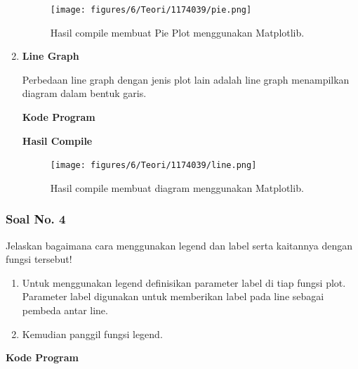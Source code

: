 \begin{enumerate}
	\begin{figure}[H]
		\texttt{[image: figures/6/Teori/1174039/pie.png]}
		\centering
		\caption{Hasil compile membuat Pie Plot menggunakan Matplotlib.}
	\end{figure}
	
	\item \textbf{Line Graph}
	
	Perbedaan line graph dengan jenis plot lain adalah line graph menampilkan diagram dalam bentuk garis.
	
	\textbf{Kode Program}
	
	
	
	\textbf{Hasil Compile}
	
	\begin{figure}[H]
		\texttt{[image: figures/6/Teori/1174039/line.png]}
		\centering
		\caption{Hasil compile membuat diagram menggunakan Matplotlib.}
	\end{figure}
	
\end{enumerate}

\subsubsection{Soal No. 4}
\hfill \break
Jelaskan bagaimana cara menggunakan legend dan label serta kaitannya dengan fungsi tersebut!

\begin{enumerate}
	\item Untuk menggunakan legend definisikan parameter label di tiap fungsi plot. Parameter label digunakan untuk memberikan label pada line sebagai pembeda antar line.
	
	
	
	\item Kemudian panggil fungsi legend.
	
	
\end{enumerate}

\hfill \break
\textbf{Kode Program}



